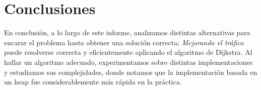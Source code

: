 \section{Conclusiones}

En conclusión, a lo largo de este informe, analizamos distintas alternativas para encarar el problema hasta obtener una solución correcta; \textit{Mejorando el tráfico} puede resolverse correcta y eficientemente aplicando el algoritmo de Dijkstra. Al hallar un algoritmo adecuado, experimentamos sobre distintas implementaciones y estudiamos sus complejidades, donde notamos que la implementación basada en un heap fue considerablemente más rápida en la práctica.